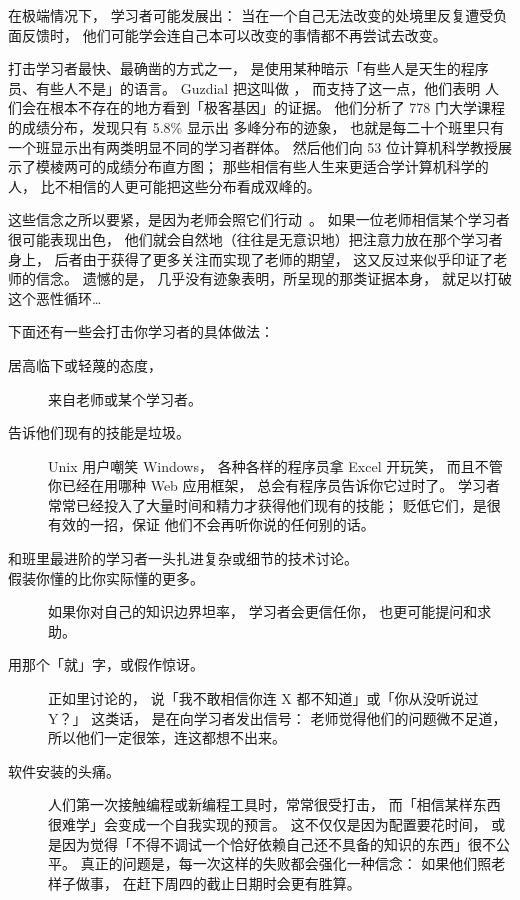 在极端情况下，
学习者可能发展出：
当在一个自己无法改变的处境里反复遭受负面反馈时，
他们可能学会连自己本可以改变的事情都不再尝试去改变。

打击学习者最快、最确凿的方式之一，
是使用某种暗示「有些人是天生的程序员、有些人不是」的语言。
Guzdial 把这叫做
，
而\cite{Pati2016}支持了这一点，他们表明
人们会在根本不存在的地方看到「极客基因」的证据。
他们分析了 778 门大学课程的成绩分布，发现只有 5.8\% 显示出
多峰分布的迹象，
也就是每二十个班里只有一个班显示出有两类明显不同的学习者群体。
然后他们向 53 位计算机科学教授展示了模棱两可的成绩分布直方图；
那些相信有些人生来更适合学计算机科学的人，
比不相信的人更可能把这些分布看成双峰的。

这些信念之所以要紧，是因为老师会照它们行动~\cite{Brop1983}。
如果一位老师相信某个学习者很可能表现出色，
他们就会自然地（往往是无意识地）把注意力放在那个学习者身上，
后者由于获得了更多关注而实现了老师的期望，
这又反过来似乎印证了老师的信念。
遗憾的是，
几乎没有迹象表明，\cite{Pati2016}所呈现的那类证据本身，
就足以打破这个恶性循环{\ldots}

下面还有一些会打击你学习者的具体做法：

\begin{description}

\item[居高临下或轻蔑的态度，]
  来自老师或某个学习者。

\item[告诉他们现有的技能是垃圾。]
  Unix 用户嘲笑 Windows，
  各种各样的程序员拿 Excel 开玩笑，
  而且不管你已经在用哪种 Web 应用框架，
  总会有程序员告诉你它过时了。
  学习者常常已经投入了大量时间和精力才获得他们现有的技能；
  贬低它们，是很有效的一招，保证
  他们不会再听你说的任何别的话。

\item[和班里最进阶的学习者一头扎进复杂或细节的技术讨论。]

\item[假装你懂的比你实际懂的更多。]
  如果你对自己的知识边界坦率，
  学习者会更信任你，
  也更可能提问和求助。

\item[用那个「就」字，或假作惊讶。]
  正如里讨论的，
  说「我不敢相信你连 X 都不知道」或「你从没听说过 Y？」
  这类话，
  是在向学习者发出信号：
  老师觉得他们的问题微不足道，
  所以他们一定很笨，连这都想不出来。

\item[软件安装的头痛。]
  人们第一次接触编程或新编程工具时，常常很受打击，
  而「相信某样东西很难学」会变成一个自我实现的预言。
  这不仅仅是因为配置要花时间，
  或是因为觉得「不得不调试一个恰好依赖自己还不具备的知识的东西」很不公平。
  真正的问题是，每一次这样的失败都会强化一种信念：
  如果他们照老样子做事，
  在赶下周四的截止日期时会更有胜算。

\end{description}


